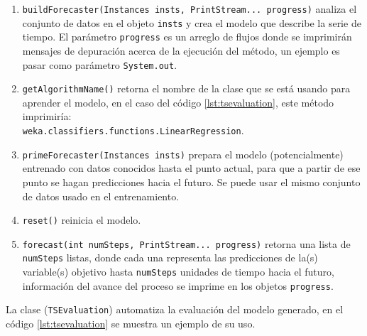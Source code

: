 \begin{enumerate}
	\item \texttt{buildForecaster(Instances insts, PrintStream... progress)} analiza el conjunto de datos en el objeto
			\texttt{insts} y crea el modelo que describe la serie de tiempo. El parámetro \texttt{progress} es un arreglo de flujos 
			donde se imprimirán mensajes de depuración acerca de la ejecución del método, un ejemplo es pasar como parámetro
			\texttt{System.out}.
			
	\item \texttt{getAlgorithmName()} retorna el nombre de la clase que se está usando para aprender el modelo, en el caso del
			código \ref{lst:tsevaluation}, este método imprimiría: \\ \texttt{weka.classifiers.functions.LinearRegression}.
			
	\item \texttt{primeForecaster(Instances insts)} prepara el modelo (potencialmente) entrenado con datos conocidos hasta el punto 
			actual, para que a partir de ese punto se hagan predicciones hacia el futuro. Se puede usar el mismo conjunto de datos
			usado en el entrenamiento. 
			
	\item \texttt{reset()} reinicia el modelo.
	
	\item \texttt{forecast(int numSteps, PrintStream... progress)} retorna una lista de \texttt{numSteps} listas, donde cada una
			representa las predicciones de la(s) variable(s) objetivo hasta \texttt{numSteps} unidades de tiempo hacia el futuro,
			información del avance del	proceso se imprime en los objetos \texttt{progress}.
\end{enumerate}

La clase (\texttt{TSEvaluation}) automatiza la evaluación del modelo generado, en el código \ref{lst:tsevaluation} se muestra un ejemplo de su uso. 


